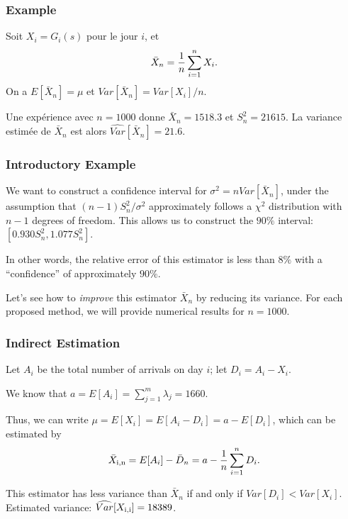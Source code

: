 \documentclass[t,usepdftitle=false]{beamer}
\begin{document}
\begin{frame}
	\frametitle{Example}
	
	Soit ${X_i} = G_i(s)$ pour le jour $i$, et 
	\[
	{\bar X_n} = {1\over n} \sum_{i=1}^n X_i.
	\]
	On a $E[\bar X_n] = \mu$ et $Var[\bar X_n] = Var[X_i]/n$.
	
	\mbox{}
	
	Une expérience avec ${n = 1000}$ donne $\bar X_n = 1518.3$ et $S_n^2
	= {21615}$.
	La variance estimée de $\bar X_n$ est alors $\widehat{Var}[\bar X_n] = 21.6$.
	
\end{frame}

\begin{frame}
	\frametitle{Introductory Example}
	
	We want to construct a confidence interval for \(\sigma^2 = n Var[\bar X_n]\), under the assumption that \((n-1)S_n^2/\sigma^2\) approximately follows a \(\chi^2\) distribution with \(n-1\) degrees of freedom. This allows us to construct the \(90\%\) interval: \([0.930S_n^2, 1.077S_n^2]\).
	
	\mbox{}
	
	In other words, the relative error of this estimator is less than \(8\%\) with a ``confidence'' of approximately \(90\%\).
	
	\mbox{}
	
	Let's see how to \emph{improve} this estimator \(\bar X_n\) by reducing its variance. For each proposed method, we will provide numerical results for \(n = 1000\).
	
\end{frame}

\begin{frame}
	\frametitle{Indirect Estimation}
	
	Let \(A_i\) be the total number of arrivals on day \(i\); let \(D_i = A_i - X_i\).
	
	\mbox{}
	
	We know that \(a = E[A_i] = \sum_{j=1}^m \lambda_j = 1660\).
	
	\mbox{}
	
	Thus, we can write \(\mu = E[X_i] = E[A_i - D_i] = a - E[D_i]\), which 
	can be estimated by
	$$ {\bar X_{\rm{i},n}} = E[A_i] - \bar D_n = a - {1\over n} \sum_{i=1}^n D_i.$$
	
	\mbox{}
	
	This estimator has less variance than \(\bar X_n\) if and only if \(Var[D_i] < Var[X_i]\). 
	Estimated variance: \(\widehat{Var}[X_{\rm{i},i}] = {18389}\).
	
\end{frame}
\end{document}
